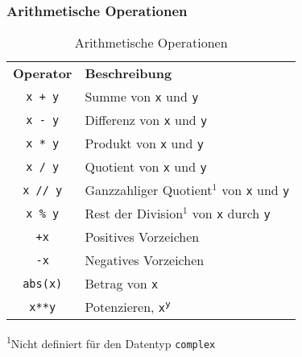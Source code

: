 \begin{minipage}[t]{0.49\textwidth}
	\subsubsection{Arithmetische Operationen}
	\begin{table}[H]
		\begin{threeparttable}
			\caption{Arithmetische Operationen}
			\begin{tabular}{|c|l|}
				\hline 
				\textbf{Operator} &\textbf{Beschreibung}\\ 
				\texttt{x + y} &Summe von \texttt{x} und \texttt{y}\\ 
				\texttt{x - y} &Differenz von \texttt{x} und \texttt{y}\\ 
				\texttt{x * y} &Produkt von \texttt{x} und \texttt{y}\\ 
				\texttt{x / y} &Quotient von \texttt{x} und \texttt{y}\\  
				\texttt{x // y} &Ganzzahliger Quotient$^1$ von \texttt{x} und \texttt{y}\\ 
				\texttt{x \% y} &Rest der Division$^1$ von \texttt{x} durch \texttt{y}\\ 
				\texttt{+x} &Positives Vorzeichen\\ 
				\texttt{-x} &Negatives Vorzeichen\\ 
				\texttt{abs(x)} &Betrag von \texttt{x}\\ 
				\texttt{x**y} &Potenzieren, \texttt{x\textsuperscript{y}}\\ 
				\hline 
			\end{tabular}
			\textsuperscript{1}Nicht definiert für den Datentyp \texttt{complex}
		\end{threeparttable}
	\end{table}
\end{minipage}
\begin{minipage}[t]{0.02\textwidth} $ \quad $\end{minipage}
